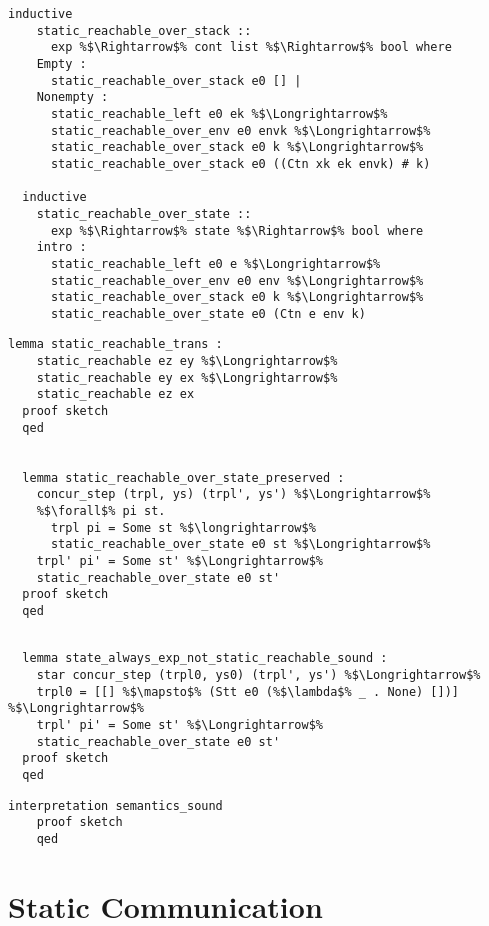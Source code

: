 \documentclass{article}
\begin{document}
\begin{lstlisting}[style=codestyle1, escapechar=\%]
  inductive
    static_reachable_over_stack ::
      exp %$\Rightarrow$% cont list %$\Rightarrow$% bool where
    Empty :
      static_reachable_over_stack e0 [] |
    Nonempty :
      static_reachable_left e0 ek %$\Longrightarrow$%
      static_reachable_over_env e0 envk %$\Longrightarrow$%
      static_reachable_over_stack e0 k %$\Longrightarrow$%
      static_reachable_over_stack e0 ((Ctn xk ek envk) # k)

  inductive
    static_reachable_over_state ::
      exp %$\Rightarrow$% state %$\Rightarrow$% bool where
    intro :
      static_reachable_left e0 e %$\Longrightarrow$%
      static_reachable_over_env e0 env %$\Longrightarrow$%
      static_reachable_over_stack e0 k %$\Longrightarrow$%
      static_reachable_over_state e0 (Ctn e env k)

  \end{lstlisting}

\begin{lstlisting}[style=codestyle1, escapechar=\%]
  lemma static_reachable_trans :
    static_reachable ez ey %$\Longrightarrow$%
    static_reachable ey ex %$\Longrightarrow$%
    static_reachable ez ex
  proof sketch 
  qed


  lemma static_reachable_over_state_preserved :
    concur_step (trpl, ys) (trpl', ys') %$\Longrightarrow$%
    %$\forall$% pi st.
      trpl pi = Some st %$\longrightarrow$%
      static_reachable_over_state e0 st %$\Longrightarrow$%
    trpl' pi' = Some st' %$\Longrightarrow$%
    static_reachable_over_state e0 st'
  proof sketch 
  qed
  \end{lstlisting}


\begin{lstlisting}[style=codestyle1, escapechar=\%]

  lemma state_always_exp_not_static_reachable_sound :
    star concur_step (trpl0, ys0) (trpl', ys') %$\Longrightarrow$%
    trpl0 = [[] %$\mapsto$% (Stt e0 (%$\lambda$% _ . None) [])] %$\Longrightarrow$%
    trpl' pi' = Some st' %$\Longrightarrow$%
    static_reachable_over_state e0 st'
  proof sketch
  qed

  \end{lstlisting}

\begin{lstlisting}[style=codestyle1, escapechar=\%]
    interpretation semantics_sound
    proof sketch
    qed
  \end{lstlisting}

\section{Static Communication}
\end{document}
